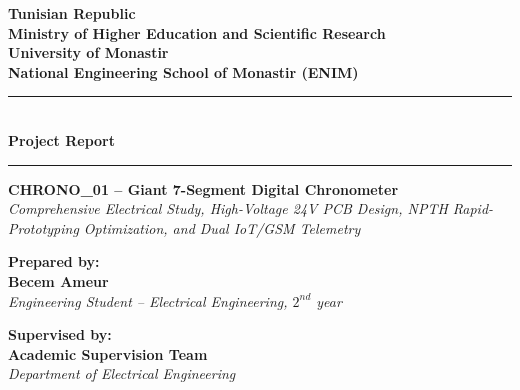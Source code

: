 \documentclass[12pt,a4paper,oneside]{report}
\begin{document}
\begin{titlepage}
    \begin{center}
        \begin{minipage}[c]{0.2\textwidth}
            \centering
        \end{minipage}
        \hfill
        \begin{minipage}[c]{0.55\textwidth}
            \centering
            {\small \textbf{Tunisian Republic}}\\
            {\small \textbf{Ministry of Higher Education and Scientific Research}}\\
            {\small \textbf{University of Monastir}}\\
            {\small \textbf{National Engineering School of Monastir (ENIM)}}
        \end{minipage}
        \hfill
        \begin{minipage}[c]{0.2\textwidth}
            \centering
        \end{minipage}
        
        \vspace{2.0cm}
        \rule{\linewidth}{1.4pt}\\[0.4cm]
        {\huge \textbf{Project Report}}\\[0.2cm]
        \rule{\linewidth}{1.4pt}
        
        \vspace{1.0cm}
        {\LARGE \textbf{CHRONO\_01 -- Giant 7-Segment Digital Chronometer}}\\[0.4cm]
        {\Large \textit{Comprehensive Electrical Study, High-Voltage 24V PCB Design, NPTH Rapid-Prototyping Optimization, and Dual IoT/GSM Telemetry}}
        
        \vspace{2.0cm}
        \begin{minipage}[t]{0.45\textwidth}
            \textbf{Prepared by:}\\[0.2cm]
            {\large \textbf{Becem Ameur}}\\[0.1cm]
            \textit{Engineering Student -- Electrical Engineering, $2^{nd}$ year}
        \end{minipage}
        \hfill
        \begin{minipage}[t]{0.45\textwidth}
            \begin{flushright}
                \textbf{Supervised by:}\\[0.2cm]
                {\large \textbf{Academic Supervision Team}}\\[0.1cm]
                \textit{Department of Electrical Engineering}
            \end{flushright}
        \end{minipage}
        

\end{center}
\end{titlepage}
\end{document}
